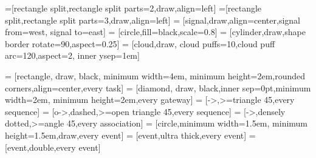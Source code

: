 =[rectangle split,rectangle split parts=2,draw,align=left]
=[rectangle split,rectangle split parts=3,draw,align=left]
 = [signal,draw,align=center,signal from=west, signal to=east]
 = [circle,fill=black,scale=0.8]
 = [cylinder,draw,shape border rotate=90,aspect=0.25]
 = [cloud,draw, cloud puffs=10,cloud puff arc=120,aspect=2, inner ysep=1em]

 = [rectangle, draw, black,
minimum width=4em, minimum height=2em,rounded corners,align=center,every task]
 = [diamond, draw, black,inner sep=0pt,minimum width=2em, minimum height=2em,every gateway]
 = [->,>=triangle 45,every sequence]
 = [o->,dashed,>=open triangle 45,every sequence]
 = [->,densely dotted,>=angle 45,every association]
 = [circle,minimum width=1.5em, minimum height=1.5em,draw,every event]
 = [event,ultra thick,every event]
 = [event,double,every event]